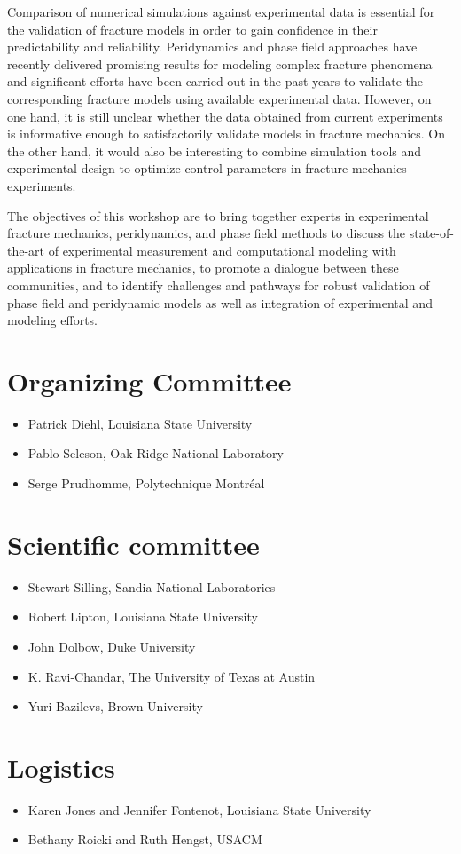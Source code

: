 Comparison of numerical simulations against experimental data is essential
for the validation of fracture models in order to gain confidence in their
predictability and reliability. Peridynamics and phase field approaches have recently
delivered promising results for modeling complex fracture phenomena and significant
efforts have been carried out in the past years to validate the corresponding
fracture models using available experimental data. However, on one hand, it is still
unclear whether the data obtained from current experiments is informative enough to
satisfactorily validate models in fracture mechanics. On the other hand, it would also be
interesting to combine simulation tools and experimental design to optimize
control parameters in fracture mechanics experiments.

The objectives of this workshop are to bring together experts in experimental fracture mechanics,
peridynamics, and phase field methods to discuss the state-of-the-art of experimental
measurement and computational modeling with applications in fracture mechanics, to promote
a dialogue between these communities, and to identify challenges and pathways for robust validation
of phase field and peridynamic models as well as integration of experimental and modeling efforts.

\section*{Organizing Committee}
\begin{itemize}
\item Patrick Diehl, Louisiana State University
\item Pablo Seleson, Oak Ridge National Laboratory
\item Serge Prudhomme,  Polytechnique Montréal
\end{itemize}

\section*{Scientific committee}
\begin{itemize}
\item Stewart Silling, Sandia National Laboratories
\item Robert Lipton, Louisiana State University
\item John Dolbow, Duke University
\item K. Ravi-Chandar, The University of Texas at Austin
\item Yuri Bazilevs, Brown University 
\end{itemize}

\section*{Logistics}
\begin{itemize}
\item Karen Jones and Jennifer Fontenot, Louisiana State University
\item Bethany Roicki and Ruth Hengst, USACM
\end{itemize}
